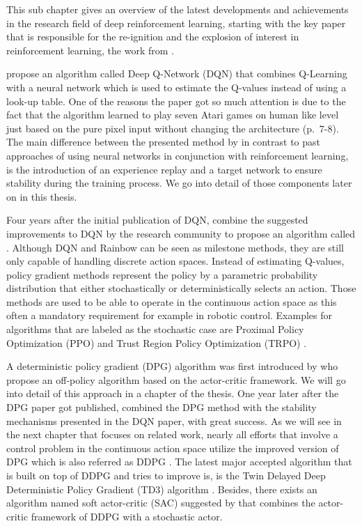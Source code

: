 This sub chapter gives an overview of the latest developments and achievements in the research field of deep reinforcement learning, starting with the key paper that is responsible for the re-ignition and the explosion of interest in reinforcement learning, the work from \cite{mnih2013playing, mnih2015human}.
\par 
\cite{mnih2013playing} propose an algorithm called Deep Q-Network
(DQN) that combines Q-Learning with a neural network which is used to estimate the Q-values instead of using a look-up table. One of the reasons the paper got so much attention is due to the fact that the algorithm learned to play seven Atari games on human like level just based on the pure pixel input without changing the architecture (p.~7-8). The main difference between the presented method by \cite{mnih2013playing} in contrast to past approaches of using neural networks in conjunction with reinforcement learning, is the introduction of an experience replay and a target network to ensure stability during the training process. We go into detail of those components later on in this thesis.
\par
Four years after the initial publication of DQN, \cite{hessel2018rainbow} combine the suggested improvements to DQN by the research community to propose an algorithm called . Although DQN and Rainbow can be seen as milestone methods, they are still only capable of handling discrete action spaces. Instead of estimating Q-values, policy gradient methods represent the policy by a parametric probability distribution that either stochastically or deterministically selects an action. Those methods are used to be able to operate in the continuous action space as this often a mandatory requirement for example in robotic control. Examples for algorithms that are labeled as the stochastic case are Proximal Policy Optimization (PPO) \cite[]{schulman2017proximal} and Trust Region Policy Optimization (TRPO) \cite[]{schulman2017trust}.
\par 
A deterministic policy gradient (DPG) algorithm was first introduced by \cite{silver2014deterministic} who propose an off-policy algorithm based on the actor-critic framework. We will go into detail of this approach in a chapter of the thesis. One year later after the DPG paper got published, \cite{lillicrap2019continuous} combined the DPG method with the stability mechanisms presented in the DQN paper, with great success. As we will see in the next chapter that focuses on related work, nearly all efforts that involve  a control problem in the continuous action space utilize the improved version of DPG which is also referred as DDPG \cite[p.~2]{lillicrap2019continuous}. The latest major accepted algorithm that is built on top of DDPG and tries to improve is, is the Twin Delayed Deep Deterministic Policy Gradient (TD3) algorithm \cite[]{fujimoto2018addressing}. Besides, there exists an algorithm named soft actor-critic (SAC) suggested by \cite{haarnoja2018soft} that combines the actor-critic framework of DDPG with a stochastic actor.

